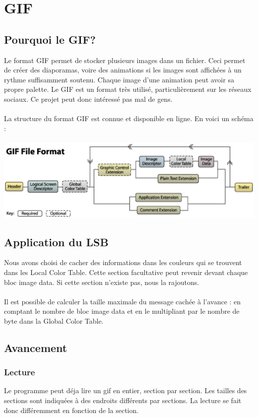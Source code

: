 \section {GIF}

\subsection {Pourquoi le GIF?}
Le format GIF permet de stocker plusieurs images dans un fichier. 
Ceci permet de créer des diaporamas, voire des animations si les images sont affichées à un rythme suffisamment soutenu. 
Chaque image d'une animation peut avoir sa propre palette.
Le GIF est un format très utilisé, particulièrement sur les réseaux sociaux. 
Ce projet peut donc intéressé pas mal de gens. \\\\

La structure du format GIF est connue et disponible en ligne. En voici un schéma : \\\\

\includegraphics[width=15cm]{gif_structure.eps}


\subsection {Application du LSB}
Nous avons choisi de cacher des informations dans les couleurs qui se trouvent dans les Local Color Table. 
Cette section facultative peut revenir devant chaque bloc image data. Si cette section n'existe pas, nous la rajoutons.\\\\

Il est possible de calculer la taille maximale du message cachée à l'avance : 
en comptant le nombre de bloc image data et en le multipliant par le nombre de byte dans la Global Color Table.


\subsection {Avancement}
\subsubsection {Lecture}
Le programme peut déja lire un gif en entier, section par section. 
Les tailles des sections sont indiquées à des endroits différents par sections. 
La lecture se fait donc différemment en fonction de la section.\\\\

